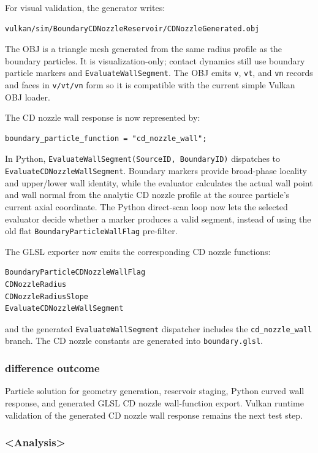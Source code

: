 For visual validation, the generator writes:
\begin{verbatim}
vulkan/sim/BoundaryCDNozzleReservoir/CDNozzleGenerated.obj
\end{verbatim}
The OBJ is a triangle mesh generated from the same radius profile as the
boundary particles.  It is visualization-only; contact dynamics still use
boundary particle markers and \texttt{EvaluateWallSegment}.  The OBJ emits
\texttt{v}, \texttt{vt}, and \texttt{vn} records and faces in
\texttt{v/vt/vn} form so it is compatible with the current simple Vulkan OBJ
loader.

The CD nozzle wall response is now represented by:
\begin{verbatim}
boundary_particle_function = "cd_nozzle_wall";
\end{verbatim}
In Python, \texttt{EvaluateWallSegment(SourceID, BoundaryID)} dispatches to
\texttt{EvaluateCDNozzleWallSegment}.  Boundary markers provide broad-phase
locality and upper/lower wall identity, while the evaluator calculates the
actual wall point and wall normal from the analytic CD nozzle profile at the
source particle's current axial coordinate.  The Python direct-scan loop now
lets the selected evaluator decide whether a marker produces a valid segment,
instead of using the old flat \texttt{BoundaryParticleWallFlag} pre-filter.

The GLSL exporter now emits the corresponding CD nozzle functions:
\begin{verbatim}
BoundaryParticleCDNozzleWallFlag
CDNozzleRadius
CDNozzleRadiusSlope
EvaluateCDNozzleWallSegment
\end{verbatim}
and the generated \texttt{EvaluateWallSegment} dispatcher includes the
\texttt{cd\_nozzle\_wall} branch.  The CD nozzle constants are generated into
\texttt{boundary.glsl}.

\subsubsection{difference outcome}

Particle solution for geometry generation, reservoir staging, Python curved
wall response, and generated GLSL CD nozzle wall-function export.  Vulkan
runtime validation of the generated CD nozzle wall response remains the next
test step.

\subsubsection{<Analysis>}

